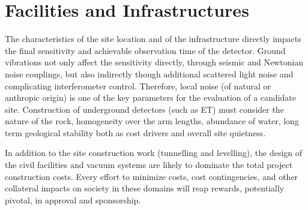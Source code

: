 \chapter{Facilities and Infrastructures}
\label{sec:Fac_Inf}
The characteristics of the site location and of the infrastructure directly impacts the final sensitivity and achievable observation time of the detector. Ground vibrations not only affect the sensitivity directly, through seismic and Newtonian noise couplings, but 
also indirectly though additional scattered light noise and 
complicating interferometer control.
Therefore, local noise (of natural or anthropic origin) is one of the key parameters for the evaluation of a candidate site.  Construction of underground detectors (such as ET) must consider the nature of the rock, homogeneity over the arm lengths, abundance of water, long term geological stability both as cost drivers and overall site quietness. 

In addition to the site construction work (tunnelling and levelling), the design of the 
civil facilities and vacuum systems are likely to dominate the total project construction costs.  Every effort to minimize costs, cost %
contingencies, and other collateral impacts on society in these domains will reap rewards,  potentially pivotal, in approval and sponsorship.

